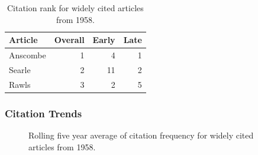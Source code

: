 \documentclass[
  10pt,
  letterpaper,
  DIV=11,
  numbers=noendperiod,
  twoside]{scrartcl}
\begin{document}
\begin{longtable}[]{@{}lrrr@{}}

\caption{\label{tbl-citation-rank-1958}Citation rank for widely cited
articles from 1958.}

\tabularnewline

\toprule\noalign{}
Article & Overall & Early & Late \\
\midrule\noalign{}
\endhead
\bottomrule\noalign{}
\endlastfoot
Anscombe & 1 & 4 & 1 \\
Searle & 2 & 11 & 2 \\
Rawls & 3 & 2 & 5 \\

\end{longtable}

\subsubsection*{Citation Trends}\label{sec-trends-1958}

\begin{figure}


\caption{\label{fig-citation-spaghetti-1958}Rolling five year average of
citation frequency for widely cited articles from 1958.}

\end{figure}%
\end{document}
